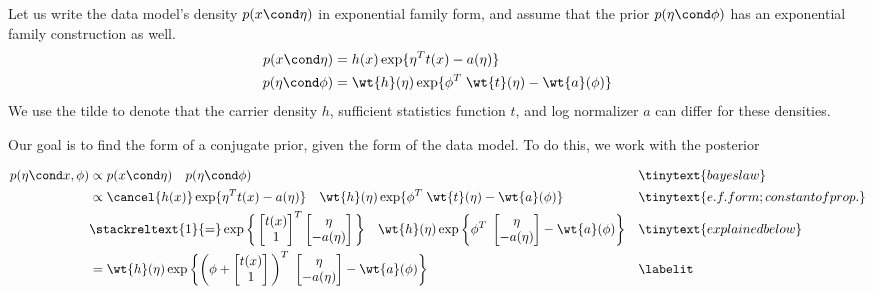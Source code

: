 
Let us write the data model's density $p(x \cond \eta)$ in exponential family form, and assume that the prior $p(\eta \cond \phi)$ has an exponential family construction as well.  
\begin{align*}
p(x \cond \eta) &= h(x) \exp \{\eta^T t(x) - a(\eta)   \}	 \\
p(\eta \cond \phi) &= \wt{h}(\eta) \exp \{\phi^T \; \wt{t}(\eta) - \wt{a}(\phi)   \}	
\end{align*}
We use the tilde to denote that the carrier density $h$, sufficient statistics function $t$, and log normalizer $a$ can differ for these densities.  

Our goal is to find the form of a conjugate prior, given the form of the data model.    To do this, we work with the posterior 

\begin{align*}
p(\eta \cond x, \phi) & \propto p(x \cond \eta) \quad p(\eta \cond \phi) && \tinytext{bayes law}  \\
&\propto  \cancel{h(x)} \exp \{\eta^T t(x) - a(\eta)  \}  \quad \wt{h}(\eta) \exp \{\phi^T \; \wt{t}(\eta) - \wt{a}(\phi)   \}	&& \tinytext{e.f. form; constant of prop.}\\
& \stackreltext{1}{=} \exp \bigg\{
\begin{bmatrix} 
t(x) \\
1 \\
\end{bmatrix}^T
\begin{bmatrix} 
\eta \\
-a(\eta)
\end{bmatrix}
\bigg\} \quad 
\wt{h}(\eta) \exp \bigg\{ \phi^T \; \begin{bmatrix} 
\eta \\
-a(\eta)
\end{bmatrix} - \wt{a}(\phi)  \bigg\} && \tinytext{explained below} \\
&= \wt{h}(\eta) \exp \bigg\{ \bigg( \phi + \begin{bmatrix} 
t(x) \\
1 \\
\end{bmatrix} \bigg)^T \; \begin{bmatrix} 
\eta \\
-a(\eta)
\end{bmatrix} - \wt{a}(\phi)  \bigg\} && 
\labelit \label{eqn:posterior_under_conjugate_prior}\\
\end{align*}

